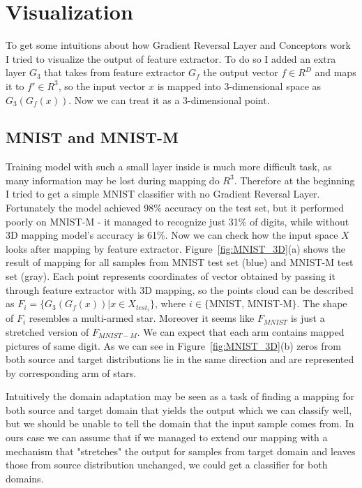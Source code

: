 \documentclass{article}
\begin{document}
\section{Visualization}
\par
To get some intuitions about how Gradient Reversal Layer and Conceptors work I tried to visualize the output of feature extractor. To do so I added an extra layer $G_{3}$ that takes from feature extractor $G_{f}$ the output vector ${ f } \in { R } ^ { D }$ and maps it to ${f'} \in {R}^{3}$, so the input vector ${x}$ is mapped into 3-dimensional space as $G_{3}(G_{f}(x))$. Now we can treat it as a 3-dimensional point. 

\subsection{MNIST and MNIST-M}
\par
Training model with such a small layer inside is much more difficult task, as many information may be lost during mapping do ${R}^{3}$. Therefore at the beginning I tried to get a simple MNIST classifier with no Gradient Reversal Layer. Fortunately the model achieved 98\% accuracy on the test set, but it performed poorly on MNIST-M - it managed to recognize just 31\% of digits, while without 3D mapping model's accuracy is 61\%. Now we can check how the input space ${X}$ looks after mapping by feature extractor. Figure~\ref{fig:MNIST_3D}(a) shows the result of mapping for all samples from MNIST test set (blue) and MNIST-M test set (gray). Each point represents coordinates of vector obtained by passing it through feature extractor with 3D mapping, so the points cloud can be described as $F_{i} = \{G_{3}(G_{f}(x)) | x \in X_{test_{i}}\}$, where $i \in \{$MNIST, MNIST-M$\}$. The shape of ${F_{i}}$ resembles a multi-armed star. Moreover it seems like $F_{MNIST}$ is just a stretched version of $F_{MNIST-M}$. We can expect that each arm contains mapped pictures of same digit. As we can see in Figure~\ref{fig:MNIST_3D}(b) zeros from both source and target distributions lie in the same direction and are represented by corresponding arm of stars. \par
Intuitively the domain adaptation may be seen as a task of finding a mapping for both source and target domain that yields the output which we can classify well, but we should be unable to tell the domain that the input sample comes from. In ours case we can assume that if we managed to extend our mapping with a mechanism that "stretches" the output for samples from target domain and leaves those from source distribution unchanged, we could get a classifier for both domains.
\end{document}
